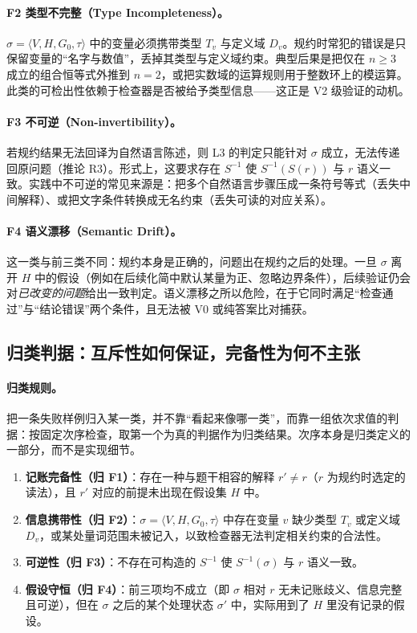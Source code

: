 \paragraph{F2 类型不完整（Type Incompleteness）。}$\sigma = \langle V,H,G_0,\tau\rangle$ 中的变量必须携带类型 $T_v$ 与定义域 $D_v$。规约时常犯的错误是只保留变量的“名字与数值”，丢掉其类型与定义域约束。典型后果是把仅在 $n \ge 3$ 成立的组合恒等式外推到 $n = 2$，或把实数域的运算规则用于整数环上的模运算。此类的可检出性依赖于检查器是否被给予类型信息——这正是 V2 级验证的动机。

\paragraph{F3 不可逆（Non-invertibility）。}若规约结果无法回译为自然语言陈述，则 L3 的判定只能针对 $\sigma$ 成立，无法传递回原问题（推论 R3）。形式上，这要求存在 $S^{-1}$ 使 $S^{-1}(S(r))$ 与 $r$ 语义一致。实践中不可逆的常见来源是：把多个自然语言步骤压成一条符号等式（丢失中间解释）、或把文字条件转换成无名约束（丢失可读的对应关系）。

\paragraph{F4 语义漂移（Semantic Drift）。}这一类与前三类不同：规约本身是正确的，问题出在规约之后的处理。一旦 $\sigma$ 离开 $H$ 中的假设（例如在后续化简中默认某量为正、忽略边界条件），后续验证仍会对\emph{已改变的问题}给出一致判定。语义漂移之所以危险，在于它同时满足“检查通过”与“结论错误”两个条件，且无法被 V0 或纯答案比对捕获。

\subsection{归类判据：互斥性如何保证，完备性为何不主张}\label{sec:mutex}

\paragraph{归类规则。}把一条失败样例归入某一类，并不靠“看起来像哪一类”，而靠一组依次求值的判据：按固定次序检查，取第一个为真的判据作为归类结果。次序本身是归类定义的一部分，而不是实现细节。

\begin{enumerate}[leftmargin=1.9em,itemsep=0.25em,label=\textbf{J\arabic*}]
\item \textbf{记账完备性（归 F1）}：存在一种与题干相容的解释 $r'\neq r$（$r$ 为规约时选定的读法），且 $r'$ 对应的前提未出现在假设集 $H$ 中。
\item \textbf{信息携带性（归 F2）}：$\sigma=\langle V,H,G_0,\tau\rangle$ 中存在变量 $v$ 缺少类型 $T_v$ 或定义域 $D_v$，或某处量词范围未被记入，以致检查器无法判定相关约束的合法性。
\item \textbf{可逆性（归 F3）}：不存在可构造的 $S^{-1}$ 使 $S^{-1}(\sigma)$ 与 $r$ 语义一致。
\item \textbf{假设守恒（归 F4）}：前三项均不成立（即 $\sigma$ 相对 $r$ 无未记账歧义、信息完整且可逆），但在 $\sigma$ 之后的某个处理状态 $\sigma'$ 中，实际用到了 $H$ 里没有记录的假设。
\end{enumerate}

